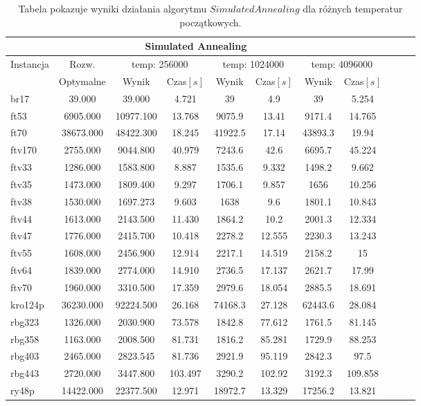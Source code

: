 \begin{center}
\begin{table}
\begin{tabular}{lcccccccccc}
\toprule
\multicolumn{8}{c}{Simulated Annealing} \\
\midrule
\multirow{2}{*}{Instancja} & {Rozw.} &
\multicolumn{2}{c}{temp: 256000} & \multicolumn{2}{c}{temp: 1024000} & 
\multicolumn{2}{c}{temp: 4096000}
 \\
 & Optymalne & Wynik & Czas$[s]$ & Wynik & Czas$[s]$ & Wynik & Czas$[s]$ 
  \\
\toprule
br17 & 39.000 & 39.000 & 4.721 & 39 & 4.9 & 39 & 5.254 \\
\midrule
ft53 & 6905.000 & 10977.100 & 13.768 & 9075.9 & 13.41 & 9171.4 & 14.765 \\
\midrule
ft70 & 38673.000 & 48422.300 & 18.245 & 41922.5 & 17.14 & 43893.3 & 19.94 \\
\midrule
ftv170 & 2755.000 & 9044.800 & 40.979 & 7243.6 & 42.6 & 6695.7 & 45.224 \\
\midrule
ftv33 & 1286.000 & 1583.800 & 8.887 & 1535.6 & 9.332 & 1498.2 & 9.662 \\
\midrule
ftv35 & 1473.000 & 1809.400 & 9.297 & 1706.1 & 9.857 & 1656 & 10.256 \\
\midrule
ftv38 & 1530.000 & 1697.273 & 9.603 & 1638 & 9.6 & 1801.1 & 10.843 \\
\midrule
ftv44 & 1613.000 & 2143.500 & 11.430 & 1864.2 & 10.2 & 2001.3 & 12.334 \\
\midrule
ftv47 & 1776.000 & 2415.700 & 10.418 & 2278.2 & 12.555 & 2230.3 & 13.243 \\
\midrule
ftv55 & 1608.000 & 2456.900 & 12.914 & 2217.1 & 14.519 & 2158.2 & 15 \\
\midrule
ftv64 & 1839.000 & 2774.000 & 14.910 & 2736.5 & 17.137 & 2621.7 & 17.99 \\
\midrule
ftv70 & 1960.000 & 3310.500 & 17.359 & 2979.6 & 18.054 & 2885.5 & 18.691 \\
\midrule
kro124p & 36230.000 & 92224.500 & 26.168 & 74168.3 & 27.128 & 62443.6 & 28.084 \\
\midrule
rbg323 & 1326.000 & 2030.900 & 73.578 & 1842.8 & 77.612 & 1761.5 & 81.145 \\
\midrule
rbg358 & 1163.000 & 2008.500 & 81.731 & 1816.2 & 85.281 & 1729.9 & 88.253 \\
\midrule
rbg403 & 2465.000 & 2823.545 & 81.736 & 2921.9 & 95.119 & 2842.3 & 97.5 \\
\midrule
rbg443 & 2720.000 & 3447.800 & 103.497 & 3290.2 & 102.92 & 3192.3 & 109.858 \\
\midrule
ry48p & 14422.000 & 22377.500 & 12.971 & 18972.7 & 13.329 & 17256.2 & 13.821 \\
\bottomrule
\end{tabular}
\label{sa_diferent_temp}
\caption{Tabela pokazuje wyniki działania algorytmu $Simulated Annealing$
dla różnych temperatur początkowych.}
\end{table}
\end{center}


